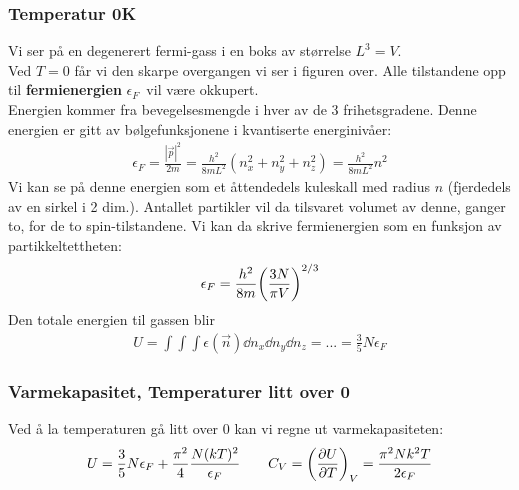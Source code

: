 \documentclass[10pt,a4paper]{article}
\renewcommand{\b}{\textbf}
\begin{document}
\begin{multicols}{2}
\subsubsection*{Temperatur 0K}
Vi ser på en degenerert fermi-gass i en boks av størrelse $L^3 = V$. \\
Ved $T=0$ får vi den skarpe overgangen vi ser i figuren over. Alle tilstandene opp til \b{fermienergien} $\epsilon_F$ vil være okkupert.\\
Energien kommer fra bevegelsesmengde i hver av de 3 frihetsgradene. Denne energien er gitt av bølgefunksjonene i kvantiserte energinivåer:
\begin{align*}
	\epsilon_F = \frac{|\vec{p}|^2}{2m} = \frac{h^2}{8mL^2}(n_x^2 + n_y^2 + n_z^2) = \frac{h^2}{8mL^2}n^2
\end{align*}
Vi kan se på denne energien som et åttendedels kuleskall med radius $n$ (fjerdedels av en sirkel i 2 dim.). Antallet partikler vil da tilsvaret volumet av denne, ganger to, for de to spin-tilstandene. Vi kan da skrive fermienergien som en funksjon av partikkeltettheten:
\begin{align*}
	\epsilon_F = \frac{h^2}{8m}\qty(\frac{3N}{\pi V})^{2/3}
\end{align*}
Den totale energien til gassen blir
\begin{align*}
	U = \int\int\int \epsilon(\vec{n}) \dd n_x \dd n_y \dd n_z = ... = \frac{3}{5}N\epsilon_F
\end{align*}


\subsubsection*{Varmekapasitet, Temperaturer litt over 0}
Ved å la temperaturen gå litt over 0 kan vi regne ut varmekapasiteten:
\begin{align*}
	U = \frac{3}{5}N\epsilon_F + \frac{\pi^2}{4}\frac{N(kT)^2}{\epsilon_F} \quad\quad
	C_V = \qty(\pdv{U}{T})_V = \frac{\pi^2Nk^2T}{2\epsilon_F}
\end{align*}



\end{multicols}
\end{document}
